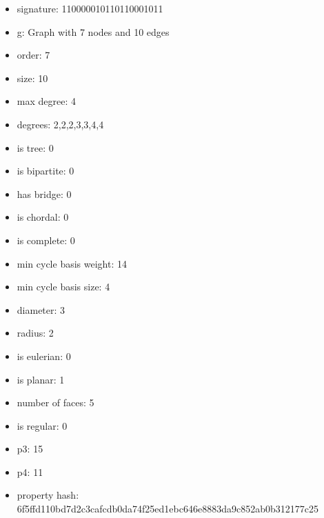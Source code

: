 \begin{itemize}
\item signature: 110000010110110001011
\item g: Graph with 7 nodes and 10 edges
\item order: 7
\item size: 10
\item max degree: 4
\item degrees: 2,2,2,3,3,4,4
\item is tree: 0
\item is bipartite: 0
\item has bridge: 0
\item is chordal: 0
\item is complete: 0
\item min cycle basis weight: 14
\item min cycle basis size: 4
\item diameter: 3
\item radius: 2
\item is eulerian: 0
\item is planar: 1
\item number of faces: 5
\item is regular: 0
\item p3: 15
\item p4: 11
\item property hash: 6f5ffd110bd7d2c3cafcdb0da74f25ed1ebc646e8883da9c852ab0b312177c25
\end{itemize}
\newpage
\begin{figure}
\end{figure}
